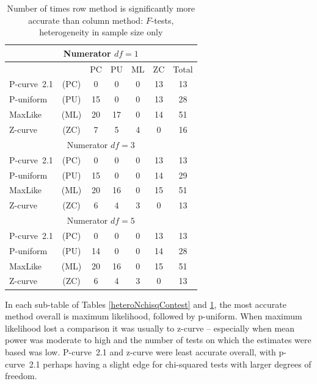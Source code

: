 \documentclass[jou]{apa6} %
\begin{document}
\begin{table} %
\caption{Number of times row method is significantly more accurate than column method: $F$-tests, heterogeneity in sample size only}
{\small
\begin{center}
\begin{tabular}{l c ccccc }  \hline
\multicolumn{7}{c}{Numerator $df=1$} \\ \hline
& &       PC & PU & ML & ZC & Total  \\
P-curve~2.1   & (PC)   &  0    &    0   &    0  &   13 & 13  \\
P-uniform & (PU)   & 15    &    0   &    0  &   13 & 28  \\
MaxLike   & (ML)   & 20    &   17   &    0  &   14 & 51  \\
Z-curve   & (ZC)   &  7    &    5   &    4  &    0 & 16  \\ \hline
\multicolumn{7}{c}{Numerator $df=3$} \\ \hline
P-curve~2.1   & (PC)   &  0    &    0   &    0  &   13 & 13  \\
P-uniform & (PU)   & 15    &    0   &    0  &   14 & 29  \\
MaxLike   & (ML)   & 20    &   16   &    0  &   15 & 51  \\
Z-curve   & (ZC)   &  6    &    4   &    3  &    0 & 13  \\ \hline
\multicolumn{7}{c}{Numerator $df=5$} \\ \hline
P-curve~2.1   & (PC)  &   0    &    0   &    0  &   13 & 13  \\
P-uniform & (PU)  &   14   &    0   &    0  &   14 & 28  \\
MaxLike   & (ML)  &   20   &   16   &    0  &   15 & 51  \\
Z-curve   & (ZC)  &    6   &    4   &    3  &    0 & 13  \\ \hline
\end{tabular}
\end{center}
} %
\label{heteroNftestContest}  %
\end{table}

In each sub-table of Tables \ref{heteroNchisqContest} and \ref{heteroNftestContest}, the most accurate method overall is maximum likelihood, followed by p-uniform. When maximum likelihood lost a comparison it was usually to z-curve -- especially when mean power was moderate to high and the number of tests on which the estimates were based was low. P-curve~2.1 and z-curve were least accurate overall, with p-curve~2.1 perhaps having a slight edge for chi-squared tests with larger degrees of freedom.
\end{document}

